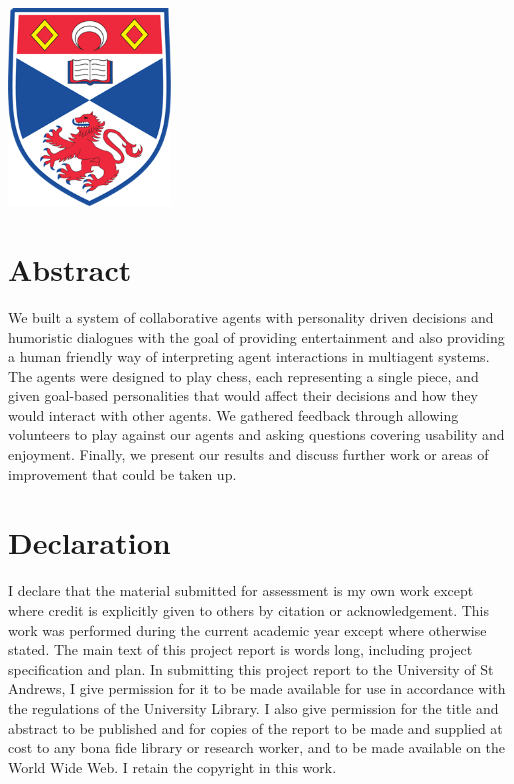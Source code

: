 \documentclass{article}
\begin{document}
\begin{titlepage}
\includegraphics[width = 4.3cm]{images/standrewslogo.png}
 

\vfill %

\end{titlepage}

\section*{Abstract}

We built a system of collaborative agents with personality driven decisions and humoristic dialogues with the goal of providing entertainment and also providing a human friendly way of interpreting agent interactions in multiagent systems. The agents were designed to play chess, each representing a single piece, and given goal-based personalities that would affect their decisions and how they would interact with other agents. We gathered feedback through allowing volunteers to play against our agents and asking questions covering usability and enjoyment. Finally, we present our results and discuss further work or areas of improvement that could be taken up.

\section*{Declaration}

I declare that the material submitted for
assessment is my own work except where credit is
explicitly given to others by citation or
acknowledgement. This work was performed during
the current academic year except where otherwise
stated.
The main text of this project report is %
words long, including project specification and plan.
In submitting this project report to the University of
St Andrews, I give permission for it to be made
available for use in accordance with the regulations of
the University Library. I also give permission for
the title and abstract to be published and for copies of
the report to be made and supplied at cost to any bona
fide library or research worker, and to be made
available on the World Wide Web. I retain the
copyright in this work.
\end{document}
